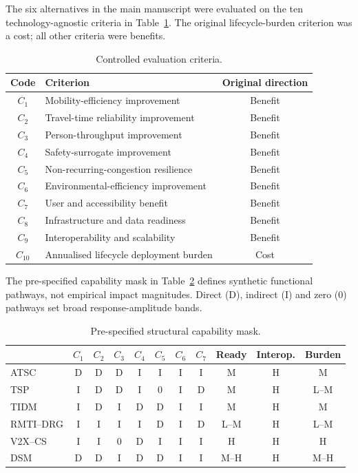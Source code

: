 \documentclass[runningheads,orivec]{llncs}
\begin{document}
The six alternatives in the main manuscript were evaluated on the ten technology-agnostic
criteria in Table~\ref{supp:tab:criteria}. The original lifecycle-burden criterion was a cost;
all other criteria were benefits.

\begin{table}[t]
\centering
\caption{Controlled evaluation criteria.}
\label{supp:tab:criteria}
\small
\begin{tabularx}{\linewidth}{@{}c X c@{}}
\toprule
Code & Criterion & Original direction\\
\midrule
$C_1$ & Mobility-efficiency improvement & Benefit\\
$C_2$ & Travel-time reliability improvement & Benefit\\
$C_3$ & Person-throughput improvement & Benefit\\
$C_4$ & Safety-surrogate improvement & Benefit\\
$C_5$ & Non-recurring-congestion resilience & Benefit\\
$C_6$ & Environmental-efficiency improvement & Benefit\\
$C_7$ & User and accessibility benefit & Benefit\\
$C_8$ & Infrastructure and data readiness & Benefit\\
$C_9$ & Interoperability and scalability & Benefit\\
$C_{10}$ & Annualised lifecycle deployment burden & Cost\\
\bottomrule
\end{tabularx}
\end{table}

The pre-specified capability mask in Table~\ref{supp:tab:mask} defines synthetic functional
pathways, not empirical impact magnitudes. Direct (D), indirect (I) and zero (0) pathways set
broad response-amplitude bands.

\begin{table}[t]
\centering
\caption{Pre-specified structural capability mask.}
\label{supp:tab:mask}
\scriptsize
\begin{tabular}{@{}lccccccc ccc@{}}
\toprule
 & $C_1$ & $C_2$ & $C_3$ & $C_4$ & $C_5$ & $C_6$ & $C_7$ & Ready & Interop. & Burden\\
\midrule
ATSC      & D & D & D & I & I & I & I & M    & H & M\\
TSP       & I & D & D & I & 0 & I & D & M    & H & L--M\\
TIDM      & I & D & I & D & D & I & I & M    & H & M\\
RMTI--DRG & I & I & I & I & D & I & D & L--M & H & L--M\\
V2X--CS   & I & I & 0 & D & I & I & I & H    & H & H\\
DSM       & D & D & I & D & D & I & I & M--H & H & M--H\\
\bottomrule
\end{tabular}
\end{table}
\end{document}
